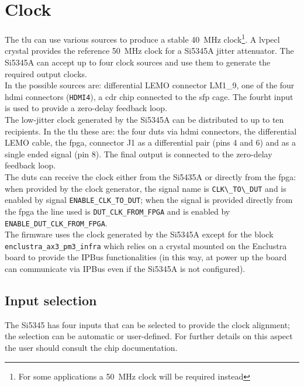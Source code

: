 \chapter{Clock}\label{ch:clock}
The \gls{tlu} can use various sources to produce a stable 40~MHz clock\footnote{For some applications a 50~MHz clock will be required instead}. A \gls{lvpecl} crystal provides the reference 50~MHz clock for a Si5345A jitter attenuator. The Si5345A can accept up to four clock sources and use them to generate the required output clocks.\\
In \brd the possible sources are: differential LEMO connector LM1\_9, one of the four \gls{hdmi} connectors (\verb|HDMI4|), a \gls{cdr} chip connected to the \gls{sfp} cage. The fourht input is used to provide a zero-delay feedback loop.\\
The low-jitter clock generated by the Si5345A can be distributed to up to ten recipients. In the \gls{tlu} these are: the four \gls{dut}s via \gls{hdmi} connectors, the differential LEMO cable, the \gls{fpga},  connector J1 as a differential pair (pins 4 and 6) and as a single ended signal (pin 8). The final output is connected to the zero-delay feedback loop.\\
The \gls{dut}s can receive the clock either from the Si5435A or directly from the \gls{fpga}: when provided by the clock generator, the signal name is \verb|CLK\_TO\_DUT| and is enabled by signal \verb|ENABLE_CLK_TO_DUT|; when the signal is provided directly from the \gls{fpga} the line used is \verb|DUT_CLK_FROM_FPGA| and is enabled by \verb|ENABLE_DUT_CLK_FROM_FPGA|.\\
The firmware uses the clock generated by the Si5345A except for the block \verb|enclustra_ax3_pm3_infra| which relies on a crystal mounted on the Enclustra board to provide the IPBus functionalities (in this way, at power up the board can communicate via IPBus even if the Si5345A is not configured).

\section{Input selection}
The Si5345 has four inputs that can be selected to provide the clock alignment; the selection can be automatic or user-defined. For further details on this aspect the user should consult the chip documentation.

